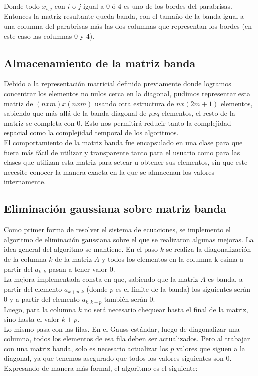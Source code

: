 Donde todo $x_{i,j}$ con $i$ o $j$ igual a $0$ ó $4$ es uno de los bordes del parabrisas.
\\
Entonces la matriz resultante queda banda, con el tamaño de la banda igual a una columna del parabrisas más las dos columnas que representan los bordes (en este caso las columnas $0$ y $4$).

\subsection{Almacenamiento de la matriz banda}

Debido a la representación matricial definida previamente donde logramos concentrar los elementos no nulos cerca en la diagonal, pudimos representar esta matriz de $(nxm)x(nxm)$ usando otra estructura de $nx(2m+1)$ elementos, sabiendo que más allá de la banda diagonal de $pxq$ elementos, el resto de la matriz se completa con $0$. Esto nos permitirá reducir tanto la complejidad espacial como la complejidad temporal de los algoritmos.
\\
El comportamiento de la matriz banda fue encapsulado en una clase para que fuera más fácil de utilizar y transparente tanto para el usuario como para las clases que utilizan esta matriz para setear u obtener sus elementos, sin que este necesite conocer la manera exacta en la que se almacenan los valores internamente.

\subsection{Eliminación gaussiana sobre matriz banda}

Como primer forma de resolver el sistema de ecuaciones, se implemento el algoritmo de eliminación gaussiana sobre el que se realizaron algunas mejoras. La idea general del algoritmo se mantiene. En el paso $k$ se realiza la diagonalización de la columna $k$ de la matriz $A$ y todos los elementos en la columna k-esima a partir del $a_{k,k}$ pasan a tener valor $0$.
\\
La mejora implementada consta en que, sabiendo que la matriz $A$ es banda, a partir del elemento $a_{k+p,k}$ (donde $p$ es el límite de la banda) los siguientes serán $0$ y a partir del elemento $a_{k,k+p}$ también serán $0$.
\\
Luego, para la columna $k$ no será necesario chequear hasta el final de la matriz, sino hasta el valor $k+p$.
\\
Lo mismo pasa con las filas. En el Gauss estándar, luego de diagonalizar una columna, todos los elementos de esa fila deben ser actualizados. Pero al trabajar con una matriz banda, solo es necesario actualizar los $p$ valores que siguen a la diagonal, ya que tenemos asegurado que todos los valores siguientes son $0$.
\\
Expresando de manera más formal, el algoritmo es el siguiente:

